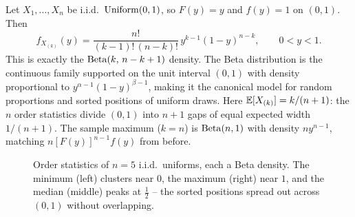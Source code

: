 \begin{example}
\label{ch16:unif-order-beta}
Let $X_1,\dots,X_n$ be i.i.d.\ $\operatorname{Uniform}(0,1)$, so $F(y)=y$ and $f(y)=1$ on $(0,1)$. Then
\[
  f_{X_{(k)}}(y) = \frac{n!}{(k-1)!\,(n-k)!}\,y^{k-1}(1-y)^{n-k}, \qquad 0<y<1.
\]
This is exactly the $\operatorname{Beta}(k,\,n-k+1)$ density. The Beta distribution is the continuous family
supported on the unit interval $(0,1)$ with density proportional to $y^{\alpha-1}(1-y)^{\beta-1}$,
making it the canonical model for random proportions and sorted positions of uniform draws.
Here $\operatorname{\mathbb{E}}[X_{(k)}] = k/(n+1)$: the $n$ order statistics divide $(0,1)$ into $n+1$ gaps of equal
expected width $1/(n+1)$. The sample maximum ($k=n$) is $\operatorname{Beta}(n,1)$ with density $n y^{n-1}$,
matching $n[F(y)]^{n-1}f(y)$ from before.
\end{example}

\begin{figure}[H]
\centering
{}
\caption{Order statistics of $n=5$ i.i.d.\ uniforms, each a Beta density. The minimum
(left) clusters near $0$, the maximum (right) near $1$, and the median (middle) peaks at
$\tfrac12$ -- the sorted positions spread out across $(0,1)$ without overlapping.}
\label{ch16:fig-order}
\end{figure}

